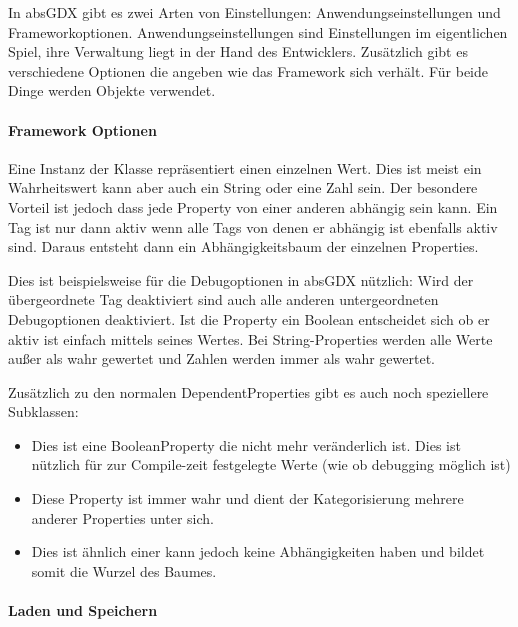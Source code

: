 
In absGDX gibt es zwei Arten von Einstellungen: Anwendungseinstellungen und Frameworkoptionen.
Anwendungseinstellungen sind Einstellungen im eigentlichen Spiel, ihre Verwaltung liegt in der Hand des Entwicklers.
Zusätzlich gibt es verschiedene Optionen die angeben wie das Framework sich verhält. Für beide Dinge werden  Objekte verwendet.

\paragraph{Framework Optionen}

Eine Instanz der Klasse  repräsentiert einen einzelnen Wert. Dies ist meist ein Wahrheitswert kann aber auch ein String oder eine Zahl sein.
Der besondere Vorteil ist jedoch dass jede Property von einer anderen abhängig sein kann. Ein Tag ist nur dann aktiv wenn alle Tags von denen er abhängig ist ebenfalls aktiv sind. Daraus entsteht dann ein Abhängigkeitsbaum der einzelnen Properties.


Dies ist beispielsweise für die Debugoptionen in absGDX nützlich: Wird der übergeordnete Tag  deaktiviert sind auch alle anderen untergeordneten Debugoptionen deaktiviert. 
Ist die Property ein Boolean entscheidet sich ob er aktiv ist einfach mittels seines Wertes. 
Bei String-Properties werden alle Werte außer  als wahr gewertet und Zahlen werden immer als wahr gewertet.

Zusätzlich zu den normalen DependentProperties gibt es auch noch speziellere Subklassen:

\begin{itemize}
\item {} Dies ist eine BooleanProperty die nicht mehr veränderlich ist. Dies ist nützlich für zur Compile-zeit festgelegte Werte (wie ob debugging möglich ist)
\item {} Diese Property ist immer wahr und dient der Kategorisierung mehrere anderer Properties unter sich.
\item {} Dies ist ähnlich einer  kann jedoch keine Abhängigkeiten haben und bildet somit die Wurzel des Baumes.
\end{itemize}

\paragraph{Laden und Speichern}

